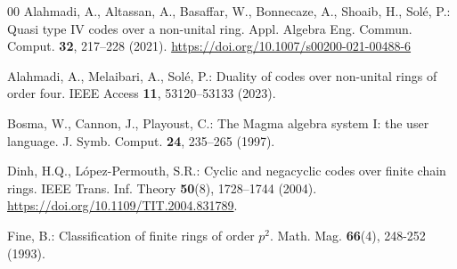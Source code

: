 \documentclass[12pt]{article}
\theoremstyle{definition}
\theoremstyle{plain}
\begin{document}
\begin{thebibliography}{00}
 Alahmadi, A., Altassan, A., Basaffar, W., Bonnecaze, A., Shoaib, H., Solé, P.: Quasi type IV codes over a non-unital ring. Appl. Algebra Eng. Commun. Comput. \textbf{32}, 217–228 (2021). \href{https://doi.org/10.1007/s00200-021-00488-6}{https://doi.org/10.1007/s00200-021-00488-6}






 Alahmadi, A., Melaibari, A., Sol\'{e}, P.: Duality of codes over non-unital rings of order four. IEEE Access \textbf{11}, 53120–53133 (2023).




 Bosma, W., Cannon, J., Playoust, C.: The Magma algebra system I: the user language. J. Symb. Comput. \textbf{24}, 235–265 (1997).






Dinh, H.Q., L\'{o}pez-Permouth, S.R.: Cyclic and negacyclic codes over finite chain rings. IEEE Trans. Inf. Theory \textbf{50}(8), 1728--1744 (2004). \href{https://doi.org/10.1109/TIT.2004.831789}{https://doi.org/10.1109/TIT.2004.831789}.




 Fine, B.: Classification of finite rings of order $p^2$. Math. Mag. \textbf{66}(4), 248-252 (1993).



\end{thebibliography}
\end{document}

